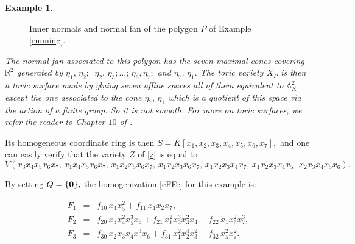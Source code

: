 \documentclass[a4paper,11pt]{amsart}
\newcommand{\A}{\mathbb{A}}
\newcommand{\R}{\mathbb{R}}
\newcounter{thm}
\numberwithin{thm}{section}
\numberwithin{equation}{section}
\theoremstyle{definition}
\newtheorem{example}[thm]{Example}
\theoremstyle{plain}
\begin{document}
\begin{example}
\begin{figure}
   \caption{Inner normals and normal fan of the polygon $P$ of  Example  \ref{running}.}  \label{figoo}
\end{figure}
{\em
The normal fan associated to this polygon has the seven maximal cones covering $\R^2$ generated by $\eta_1,\,\eta_2;$\, $\eta_2,\,\eta_3;\ldots;\, \eta_6,\eta_7;$ and $\eta_7,\,\eta_1.$ The toric variety $X_P$ is then a toric surface made by gluing seven affine spaces all of them equivalent to $\A_K^2$ except the one associated to the cone $\eta_7,\,\eta_1$ which is a quotient of this space via the action of a finite group. So it is not smooth. For more on toric surfaces, we refer the reader to Chapter $10$ of \cite{CLS11}.


Its homogeneous coordinate ring is then $S=K[x_1, x_2, x_3, x_4, x_5, x_6, x_7],$ and  one can easily verify that the variety $Z$ of \eqref{z} is equal to
$$V(x_3x_4x_5x_6x_7,\,x_1x_4x_5x_6x_7,\,x_1x_2x_5x_6x_7,\,x_1x_2x_3x_6x_7,\,x_1x_2x_3x_4x_7,\,x_1x_2x_3x_4x_5,\,x_2x_3x_4x_5x_6).
$$


By setting $Q=\{\bf0\},$ the homogenization \eqref{eFFe}  for this example is:}
$$\begin{array}{ccl}
F_1&=&  f_{10}\,x_4x_5^2+f_{11} \,x_1x_2x_7, \\
F_2&=&  f_{20}\,x_3x_4^2x_5^3x_6+f_{21}\,x_1^2x_2^3x_3^2x_4+f_{22}\,x_1x_6^2x_7^3,  \\
F_3&=& f_{30}\,x_2x_3x_4x_5^3x_6+f_{31}\,x_1^2x_2^4x_3^2+f_{32}\,x_5^2x_7^2. 
\end{array}
$$

\end{example}
\end{document}
